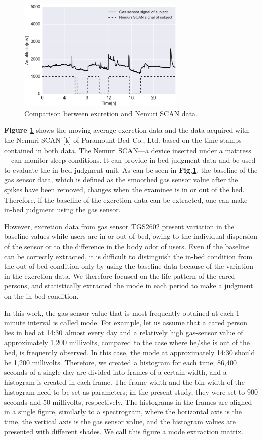 \documentclass[publish,JRM,paper]{jaciiiarticle}
\begin{document}
\begin{figure}[t]
\centering
\includegraphics[width=8cm]{./fig/inout3.eps}
\caption{Comparison between excretion and Nemuri SCAN data.}
\label{inout1}
\end{figure}
{\bf Figure \ref{inout1}} shows the moving-average excretion data and the data acquired with the Nemuri SCAN [k] of Paramount Bed Co., Ltd. based on the time stamps contained in both data. The Nemuri SCAN—a device inserted under a mattress—can monitor sleep conditions. It can provide in-bed judgment data and be used to evaluate the in-bed judgment unit. As can be seen in {\bf Fig.\ref{inout1}}, the baseline of the gas sensor data, which is defined as the smoothed gas sensor value after the spikes have been removed, changes when the examinee is in or out of the bed. Therefore, if the baseline of the excretion data can be extracted, one can make in-bed judgment using the gas sensor.

However, excretion data from gas sensor TGS2602 present variation in the baseline values while users are in or out of bed, owing to the individual dispersion of the sensor or to the difference in the body odor of users. Even if the baseline can be correctly extracted, it is difficult to distinguish the in-bed condition from the out-of-bed condition only by using the baseline data because of the variation in the excretion data. We therefore focused on the life pattern of the cared persons, and statistically extracted the mode in each period to make a judgment on the in-bed condition.

In this work, the gas sensor value that is most frequently obtained at each 1 minute interval is called mode. For example, let us assume that a cared person lies in bed at 14:30 almost every day and a relatively high gas-sensor value of approximately 1,200 millivolts, compared to the case where he/she is out of the bed, is frequently observed. In this case, the mode at approximately 14:30 should be 1,200 millivolts. Therefore, we created a histogram for each time; 86,400 seconds of a single day are divided into frames of a certain width, and a histogram is created in each frame. The frame width and the bin width of the histogram need to be set as parameters; in the present study, they were set to 900 seconds and 50 millivolts, respectively. The histograms in the frames are aligned in a single figure, similarly to a spectrogram, where the horizontal axis is the time, the vertical axis is the gas sensor value, and the histogram values are presented with different shades. We call this figure a mode extraction matrix.
\end{document}
